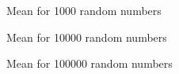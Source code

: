 \documentclass[11pt]{article}
\begin{document}
\begin{figure}[H]
	\centering
	\caption{Mean for 1000 random numbers}
\end{figure}
\begin{figure}[H]
	\centering
	\caption{Mean for 10000 random numbers}
\end{figure}
\begin{figure}[H]
	\centering
	\caption{Mean for 100000 random numbers}
\end{figure}
\end{document}
